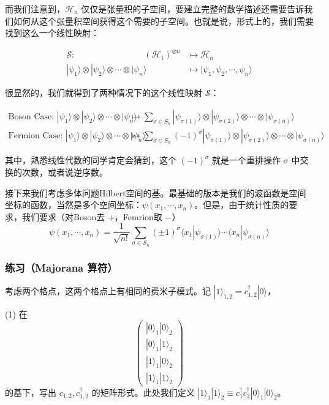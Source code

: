 而我们注意到，$\mathcal{H}_n$ 仅仅是张量积的子空间，要建立完整的数学描述还需要告诉我们如何从这个张量积空间获得这个需要的子空间。也就是说，形式上的，我们需要找到这么一个线性映射：

\begin{align}
\mathcal{S}:\quad\quad\quad\quad\quad\quad\quad\quad (\mathcal{H}_1)^{\otimes n}&\mapsto\mathcal{H}_n\\
|\psi_1\rangle\otimes|\psi_2\rangle\otimes\cdots\otimes|\psi_n\rangle &\mapsto|\psi_1,\psi_2,\cdots,\psi_n\rangle
\end{align}

很显然的，我们就得到了两种情况下的这个线性映射 $\mathcal{S}$：

\begin{align}
\text{Boson Case: }
|\psi_1\rangle\otimes|\psi_2\rangle\otimes\cdots\otimes|\psi_n\rangle &\mapsto \sum_{{\sigma}\in S_n}|\psi_{\sigma(1)}\rangle\otimes|\psi_{\sigma(2)}\rangle\otimes\cdots\otimes|\psi_{\sigma(n)}\rangle\\
\text{Fermion Case: }
|\psi_1\rangle\otimes|\psi_2\rangle\otimes\cdots\otimes|\psi_n\rangle &\mapsto \sum_{{\sigma}\in S_n}(-1)^{\sigma}|\psi_{\sigma(1)}\rangle\otimes|\psi_{\sigma(2)}\rangle\otimes\cdots\otimes|\psi_{\sigma(n)}\rangle
\end{align}

其中，熟悉线性代数的同学肯定会猜到，这个 $(-1)^{\sigma}$ 就是一个重排操作 $\sigma$ 中交换的次数，或者说逆序数。

接下来我们考虑多体问题Hilbert空间的基。最基础的版本是我们的波函数是空间坐标的函数，当然是多个空间坐标：$\psi(x_1,\cdots,x_n)$。但是，由于统计性质的要求，我们要求（对Boson去 $+$，Femrion取 $-$）
\begin{equation}
\psi(x_1,\cdots,x_n)=\frac{1}{\sqrt{n!}}\sum_{\sigma\in S_n}(\pm1)^\sigma\langle x_1|\psi_{\sigma(1)}\rangle\cdots\langle x_n|\psi_{\sigma(n)}\rangle
\end{equation}

\subsubsection{练习（Majorana 算符）}
考虑两个格点，这两个格点上有相同的费米子模式。记 $|1\rangle_{1,2}=c_{1,2}^\dagger|0\rangle$，

(1) 在
\begin{equation}
\left(\begin{matrix}|0\rangle_1|0\rangle_2\\|0\rangle_1|1\rangle_2\\|1\rangle_1|0\rangle_2\\|1\rangle_1|1\rangle_2\end{matrix}\right) 
\end{equation}
的基下，写出 $c_{1,2}, c_{1,2}^\dagger$ 的矩阵形式。此处我们定义 $|1\rangle_1|1\rangle_2\equiv c_1^\dagger c_2^\dagger|0\rangle_1|0\rangle_2$。
